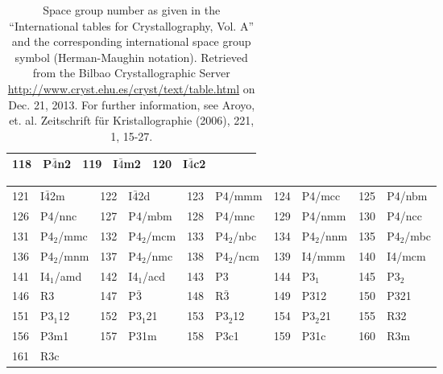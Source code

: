 \documentclass[final,12pt]{article}
\begin{document}
{{{{{{\begin{table}[h!]
\begin{center}
\begin{tabular}{||r|l||r|l||r|l||r|l||r|l||}
118    & P$\bar{4}$n2              & 
119    & I$\bar{4}$m2              & 
120    & I$\bar{4}$c2              \\
\hline
\end{tabular}
\end{center}
\caption{\label{table:spacegroupnumber_a}Space group number as given
  in the ``International tables for Crystallography, Vol. A'' and the
  corresponding international space group symbol (Herman-Maughin
  notation). Retrieved from the Bilbao Crystallographic Server
  \url{http://www.cryst.ehu.es/cryst/text/table.html} on Dec. 21,
  2013.  For further information, see Aroyo, et. al. Zeitschrift f\"ur
  Kristallographie (2006), 221, 1, 15-27.  }
\end{table}


\begin{table}[!h]
\begin{center}
\begin{tabular}{||r|l||r|l||r|l||r|l||r|l||}
\hline
121    & I$\bar{4}$2m              & 
122    & I$\bar{4}$2d              & 
123    & P4/mmm             & 
124    & P4/mcc             & 
125    & P4/nbm             \\
126    & P4/nnc             & 
127    & P4/mbm             & 
128    & P4/mnc             & 
129    & P4/nmm             & 
130    & P4/ncc             \\
131    & P4$_2$/mmc         & 
132    & P4$_2$/mcm         & 
133    & P4$_2$/nbc         & 
134    & P4$_2$/nnm         & 
135    & P4$_2$/mbc         \\
136    & P4$_2$/mnm         & 
137    & P4$_2$/nmc         & 
138    & P4$_2$/ncm         & 
139    & I4/mmm             & 
140    & I4/mcm             \\
141    & I4$_1$/amd         & 
142    & I4$_1$/acd         & 
143    & P3                 & 
144    & P3$_1$             & 
145    & P3$_2$             \\
146    & R3                 & 
147    & P$\bar{3}$         & 
148    & R$\bar{3}$         & 
149    & P312               & 
150    & P321               \\
151    & P3$_1$12           & 
152    & P3$_1$21           & 
153    & P3$_2$12           & 
154    & P3$_2$21           & 
155    & R32                \\
156    & P3m1               & 
157    & P31m               & 
158    & P3c1               & 
159    & P31c               & 
160    & R3m                \\
161    & R3c                & 

\end{tabular}
\end{center}
\end{table}}}}}}}
\end{document}
